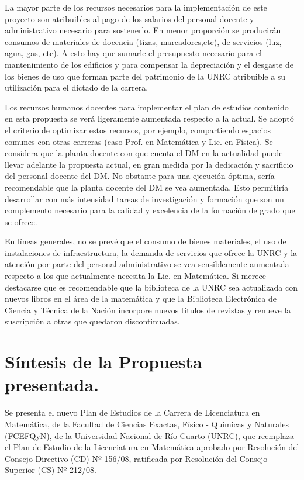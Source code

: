 \documentclass[a4paper, 12pt]{article}
\begin{document}
La mayor parte de los recursos necesarios para la implementación de este proyecto son atribuibles al pago de los salarios del personal docente y administrativo necesario para sostenerlo. En menor proporción se producirán  consumos de materiales de docencia (tizas, marcadores,etc), de servicios (luz, agua, gas, etc). A esto hay que sumarle el presupuesto necesario para el mantenimiento   de los edificios y para compensar la depreciación y el desgaste de los bienes de uso que forman parte del patrimonio de la UNRC atribuible a su utilización para el dictado de  la carrera. 

Los recursos humanos docentes para implementar el  plan de estudios contenido en esta propuesta  se verá ligeramente aumentada respecto a la actual. Se adoptó el criterio de optimizar estos recursos, por ejemplo, compartiendo espacios comunes con otras carreras (caso Prof. en Matemática y Lic. en Física).  Se considera que la planta docente con que cuenta el DM en la actualidad  puede llevar adelante la propuesta actual, en gran medida por la dedicación y sacrificio del personal docente del DM. No obstante para una ejecución óptima,  sería recomendable que la planta docente del DM se vea aumentada. Esto permitiría  desarrollar con más intensidad tareas de investigación y formación  que son un complemento necesario para la calidad y excelencia de la formación de grado que se ofrece. 

 En líneas generales, no se prevé que el consumo de bienes materiales, el uso de instalaciones de infraestructura, la demanda de servicios que ofrece la UNRC  y la atención por parte del personal administrativo  se vea sensiblemente aumentada respecto a los que actualmente necesita la Lic. en Matemática. Si merece destacarse que es recomendable que la biblioteca de la UNRC sea actualizada con nuevos libros en el área de la matemática y que la Biblioteca Electrónica de Ciencia y Técnica de 
la Nación incorpore nuevos títulos de revistas y renueve la suscripción a otras que quedaron discontinuadas. 


\section{Síntesis de la Propuesta presentada. }
 
 Se presenta el nuevo Plan de Estudios de la 
Carrera de Licenciatura en Matemática, de la Facultad de Ciencias Exactas, 
Físico - Químicas y Naturales (FCEFQyN), de la Universidad Nacional de Río Cuarto (UNRC), que  reemplaza el Plan de Estudio de la Licenciatura en Matemática aprobado por Resolución del Consejo Directivo (CD) Nº 156/08, 
ratificada por Resolución del Consejo Superior (CS) Nº 212/08.
\end{document}
